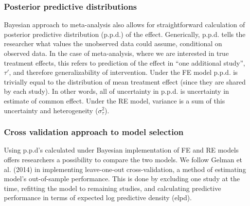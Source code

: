 \documentclass[12pt]{article}
\begin{document}
\subsubsection*{Posterior predictive distributions}

Bayesian approach to meta-analysis also allows for straightforward calculation of posterior predictive distribution (p.p.d.) of the effect. Generically, p.p.d. tells the researcher what values the unobserved data could assume, conditional on observed data. In the case of meta-analysis, where we are interested in true treatment effects, this refers to prediction of the effect in ``one additional study'', $\tau'$, and therefore generalizability of intervention. Under the FE model p.p.d. is trivially equal to the distribution of mean treatment effect (since they are shared by each study). In other words, all of uncertainty in p.p.d. is uncertainty in estimate of common effect. Under the RE model, variance is a sum of this uncertainty and heterogeneity ($\sigma_\tau^2$). 

\subsubsection*{Cross validation approach to model selection}

Using p.p.d's calculated under Bayesian implementation of FE and RE models offers researchers a possibility to compare the two models. We follow Gelman et al. (2014) in implementing leave-one-out cross-validation, a method of estimating model's out-of-sample performance. This is done by excluding one study at the time, refitting the model to remaining studies, and calculating predictive performance in terms of expected log predictive density (elpd).
\end{document}
